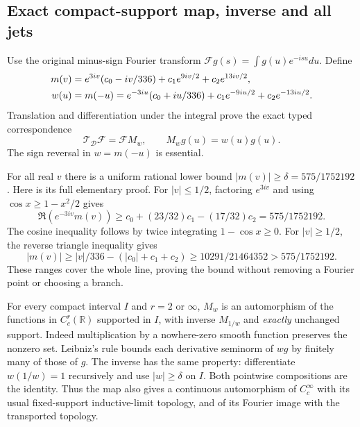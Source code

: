 \subsection{Exact compact-support map, inverse and all jets}

Use the original minus-sign Fourier transform
$\mathscr Fg(s)=\int g(u)e^{-isu}du$. Define
\begin{align}
 m(v)&=e^{3iv}(c_0-iv/336)+c_1e^{9iv/2}+c_2e^{13iv/2},\notag\\
 w(u)&=m(-u)=e^{-3iu}(c_0+iu/336)
                             +c_1e^{-9iu/2}+c_2e^{-13iu/2}.
 \label{eq:xw-multiplier}
\end{align}
Translation and differentiation under the integral prove the exact
typed correspondence
\begin{equation}
 \mathcal T_{\mathcal D}\mathscr F
       =\mathscr F M_w,\qquad M_wg(u)=w(u)g(u).
 \label{eq:xw-transform}
\end{equation}
The sign reversal in $w=m(-u)$ is essential.

For all real $v$ there is a uniform rational lower bound
$|m(v)|\ge\delta=575/1752192$. Here is its full elementary proof.
For $|v|\le1/2$, factoring $e^{3iv}$ and using
$\cos x\ge1-x^2/2$ gives
\[
 \Re(e^{-3iv}m(v))\ge
 c_0+(23/32)c_1-(17/32)c_2=575/1752192.
\]
The cosine inequality follows by twice integrating
$1-\cos x\ge0$. For $|v|\ge1/2$, the reverse triangle inequality gives
\[
 |m(v)|\ge |v|/336-(|c_0|+c_1+c_2)
       \ge10291/21464352>575/1752192.
\]
These ranges cover the whole line, proving the bound without
removing a Fourier point or choosing a branch.

For every compact interval $I$ and $r=2$ or $\infty$, $M_w$ is
an automorphism of the functions in $C_c^r(\mathbb R)$ supported in
$I$, with inverse $M_{1/w}$ and \emph{exactly} unchanged support.
Indeed multiplication by a nowhere-zero smooth function preserves
the nonzero set. Leibniz's rule bounds each derivative seminorm
of $wg$ by finitely many of those of $g$. The inverse has the same
property: differentiate $w(1/w)=1$ recursively and use $|w|\ge\delta$
on $I$. Both pointwise compositions are the identity. Thus the
map also gives a continuous automorphism of $C_c^\infty$ with its
usual fixed-support inductive-limit topology, and of its Fourier
image with the transported topology.

